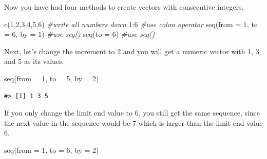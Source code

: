 \documentclass[
]{book}
\newenvironment{Shaded}{\begin{snugshade}}{\end{snugshade}}
\newcommand{\AttributeTok}[1]{\textcolor[rgb]{0.77,0.63,0.00}{#1}}
\newcommand{\CommentTok}[1]{\textcolor[rgb]{0.56,0.35,0.01}{\textit{#1}}}
\newcommand{\DecValTok}[1]{\textcolor[rgb]{0.00,0.00,0.81}{#1}}
\newcommand{\FunctionTok}[1]{\textcolor[rgb]{0.00,0.00,0.00}{#1}}
\newcommand{\NormalTok}[1]{#1}
\newcommand{\SpecialCharTok}[1]{\textcolor[rgb]{0.00,0.00,0.00}{#1}}
\newenvironment{infobox}[1]
  {
  \begin{itemize}
  \renewcommand{\labelitemi}{
    \raisebox{-.7\height}[0pt][0pt]{
      {\setkeys{Gin}{width=3em,keepaspectratio}
        \texttt{[image: pics/\#1]}}
    }
  }
  \setlength{\fboxsep}{1em}
  \begin{blackbox}
  \item
  }
  {
  \end{blackbox}
  \end{itemize}
  }
\newenvironment{blackbox}{
  \definecolor{shadecolor}{rgb}{0, 0, 0}  %
  \color{white}
  \begin{shaded}}
 {\end{shaded}}
\begin{document}
\begin{infobox}{caution}

Now you have had four methods to create vectors with consecutive integers.

\begin{Shaded}
\begin{Highlighting}[]
\FunctionTok{c}\NormalTok{(}\DecValTok{1}\NormalTok{,}\DecValTok{2}\NormalTok{,}\DecValTok{3}\NormalTok{,}\DecValTok{4}\NormalTok{,}\DecValTok{5}\NormalTok{,}\DecValTok{6}\NormalTok{)                }\CommentTok{\#write all numbers down}
\DecValTok{1}\SpecialCharTok{:}\DecValTok{6}                           \CommentTok{\#use colon operator}
\FunctionTok{seq}\NormalTok{(}\AttributeTok{from =} \DecValTok{1}\NormalTok{, }\AttributeTok{to =} \DecValTok{6}\NormalTok{, }\AttributeTok{by =} \DecValTok{1}\NormalTok{) }\CommentTok{\#use seq()}
\FunctionTok{seq}\NormalTok{(}\AttributeTok{to =} \DecValTok{6}\NormalTok{)                   }\CommentTok{\#use seq()}
\end{Highlighting}
\end{Shaded}

\end{infobox}

Next, let's change the increment to 2 and you will get a numeric vector with 1, 3 and 5 as its values.

\begin{Shaded}
\begin{Highlighting}[]
\FunctionTok{seq}\NormalTok{(}\AttributeTok{from =} \DecValTok{1}\NormalTok{, }\AttributeTok{to =} \DecValTok{5}\NormalTok{, }\AttributeTok{by =} \DecValTok{2}\NormalTok{)}
\end{Highlighting}
\end{Shaded}

\begin{verbatim}
#> [1] 1 3 5
\end{verbatim}

If you only change the limit end value to 6, you still get the same sequence, since the next value in the sequence would be 7 which is larger than the limit end value 6.

\begin{Shaded}
\begin{Highlighting}[]
\FunctionTok{seq}\NormalTok{(}\AttributeTok{from =} \DecValTok{1}\NormalTok{, }\AttributeTok{to =} \DecValTok{6}\NormalTok{, }\AttributeTok{by =} \DecValTok{2}\NormalTok{) }
\end{Highlighting}
\end{Shaded}
\end{document}
